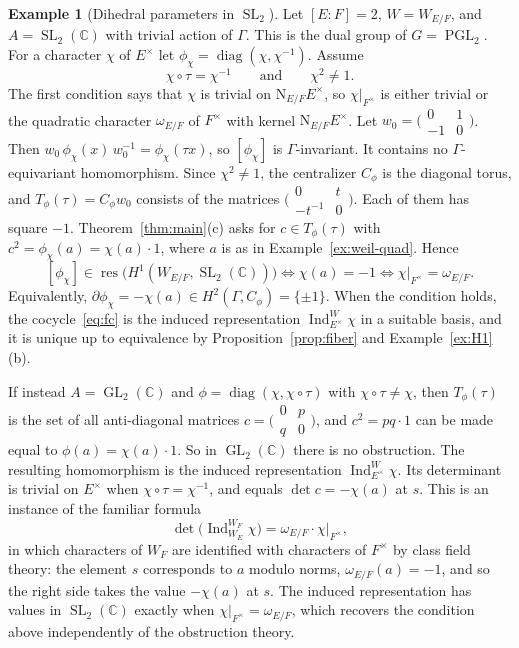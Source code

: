 \documentclass[12pt,letterpaper]{article}
\numberwithin{equation}{section}
\theoremstyle{plain}
\theoremstyle{definition}
\newtheorem{example}[theorem]{Example}
\newcommand{\C}{\mathbb{C}}
\DeclareMathOperator{\GL}{GL}
\DeclareMathOperator{\SL}{SL}
\DeclareMathOperator{\PGL}{PGL}
\DeclareMathOperator{\Ind}{Ind}
\DeclareMathOperator{\diag}{diag}
\DeclareMathOperator{\res}{res}
\newcommand{\Nm}{\mathrm{N}_{E/F}}
\begin{document}
\begin{example}[Dihedral parameters in $\SL_2$]\label{ex:dihedral}
Let $[E:F]=2$, $W=W_{E/F}$, and $A=\SL_2(\C)$ with trivial action of
$\Gamma$. This is the dual group of $G=\PGL_2$. For a character $\chi$ of
$E^\times$ let $\phi_\chi=\diag(\chi,\chi^{-1})$. Assume
\[
\chi\circ\tau=\chi^{-1}\qquad\text{and}\qquad\chi^2\neq1 .
\]
The first condition says that $\chi$ is trivial on $\Nm E^\times$, so
$\chi|_{F^\times}$ is either trivial or the quadratic character
$\omega_{E/F}$ of $F^\times$ with kernel $\Nm E^\times$. Let
$w_0=\bigl(\begin{smallmatrix}0&1\\-1&0\end{smallmatrix}\bigr)$. Then
$w_0\,\phi_\chi(x)\,w_0^{-1}=\phi_\chi(\tau x)$, so $[\phi_\chi]$ is
$\Gamma$-invariant. It contains no $\Gamma$-equivariant homomorphism.
Since $\chi^2\neq1$, the centralizer $C_\phi$ is the diagonal torus, and
$T_\phi(\tau)=C_\phi w_0$ consists of the matrices
$\bigl(\begin{smallmatrix}0&t\\-t^{-1}&0\end{smallmatrix}\bigr)$. Each of
them has square $-1$. Theorem~\ref{thm:main}(c) asks for $c\in
T_\phi(\tau)$ with $c^2=\phi_\chi(a)=\chi(a)\cdot1$, where $a$ is as in
Example~\ref{ex:weil-quad}. Hence
\[
[\phi_\chi]\in\res\bigl(H^1(W_{E/F},\SL_2(\C))\bigr)
\iff\chi(a)=-1\iff\chi|_{F^\times}=\omega_{E/F}.
\]
Equivalently, $\partial\phi_\chi=-\chi(a)\in H^2(\Gamma,C_\phi)=\{\pm1\}$.
When the condition holds, the cocycle~\eqref{eq:fc} is the induced
representation $\Ind_{E^\times}^{W}\chi$ in a suitable basis, and it is
unique up to equivalence by Proposition~\ref{prop:fiber} and
Example~\ref{ex:H1}(b).

If instead $A=\GL_2(\C)$ and $\phi=\diag(\chi,\chi\circ\tau)$ with
$\chi\circ\tau\neq\chi$, then $T_\phi(\tau)$ is the set of all
anti-diagonal matrices
$c=\bigl(\begin{smallmatrix}0&p\\q&0\end{smallmatrix}\bigr)$, and
$c^2=pq\cdot1$ can be made equal to $\phi(a)=\chi(a)\cdot1$. So in
$\GL_2(\C)$ there is no obstruction. The resulting homomorphism is the
induced representation $\Ind_{E^\times}^{W}\chi$. Its determinant is
trivial on $E^\times$ when $\chi\circ\tau=\chi^{-1}$, and equals
$\det c=-\chi(a)$ at $s$. This is an instance of the familiar formula
\[
\det\bigl(\Ind_{W_E}^{W_F}\chi\bigr)=\omega_{E/F}\cdot\chi|_{F^\times},
\]
in which characters of $W_F$ are identified with characters of $F^\times$
by class field theory: the element $s$ corresponds to $a$ modulo norms,
$\omega_{E/F}(a)=-1$, and so the right side takes the value $-\chi(a)$ at
$s$. The induced representation has values in $\SL_2(\C)$ exactly when
$\chi|_{F^\times}=\omega_{E/F}$, which recovers the condition above
independently of the obstruction theory.
\end{example}
\end{document}

